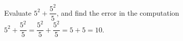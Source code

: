 Evaluate $5^2+\dfrac{5^2}{5}$, and find the error in the computation $5^2+\dfrac{5^2}{5}=\dfrac{5^2}{5}+\dfrac{5^2}{5}=5+5=10$.
